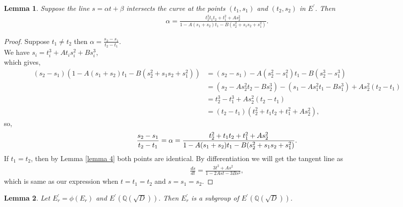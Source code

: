 \documentclass[12pt,leqno]{amsart}
\newcommand{\<}{\langle}
\renewcommand{\>}{\rangle}
\newtheorem{lemma}{Lemma}
\theoremstyle{definition}
\numberwithin{equation}{section}
\begin{document}
\begin{lemma}\label{lemma 5}
Suppose the line $s=\alpha t+\beta$ intersects the curve at the points $(t_1,s_1)$ and $(t_2,s_2)$ in $E^{'}$. Then
\begin{align*}
    \alpha=\frac{t_2^{2}t_1 t_2+t_1^{2}+As_2^{2}}{1-A(s_1+s_2)t_1-B(s_2^{2}+s_1 s_2+s_1^{2})}.
\end{align*}
\end{lemma}
\begin{proof}
    Suppose $t_1\neq t_2$ then $\alpha=\frac{s_2-s_1}{t_2-t_1}$.\\
    We have $s_i=t_i^3+At_is_i^2+Bs_i^3$,\\
    which gives,
    \begin{align*}
        (s_2-s_1)(1-A(s_1+s_2)t_1-B(s_2^2+s_1s_2+s_1^2))&=(s_2-s_1)-A(s_2^2-s_1^2)t_1-B(s_2^3-s_1^3)\\
        &=(s_2-As_2^2t_2-Bs_2^3)-(s_1-As_1^2t_1-Bs_1^3)+As_2^2(t_2-t_1)\\
        &=t_2^3-t_1^3+As_2^2(t_2-t_1)\\
        &=(t_2-t_1)(t_2^2+t_1 t_2+t_1^2+As_2^2),
    \end{align*}
    so,
    \begin{equation}\label{alpha}
        \frac{s_2-s_1}{t_2-t_1}=\alpha=\frac{t_2^2+t_1 t_2+t_1^2+As_2^2}{1-A(s_1+s_2)t_1-B(s_2^2+s_1s_2+s_1^2)}.\\
   \end{equation}
    If $t_1=t_2$, then by Lemma \ref{lemma 4} both points are identical. By differentiation we will get the tangent line as
    \begin{align*}
        \frac{ds}{dt}=\frac{3t^2+As^2}{1-2Ast-3Bs^2},
    \end{align*}
    which is same as our expression when $t=t_1=t_2$ and $s=s_1=s_2$.
\end{proof}
\begin{lemma}\label{lemma6}
Let $E_r^{'}=\phi(E_r)$ and $E^{'}(\mathbb Q(\sqrt{D}))$. Then $E_r^{'}$ is a subgroup of $E^{'}(\mathbb Q(\sqrt{D}))$.
\end{lemma}
\end{document}
